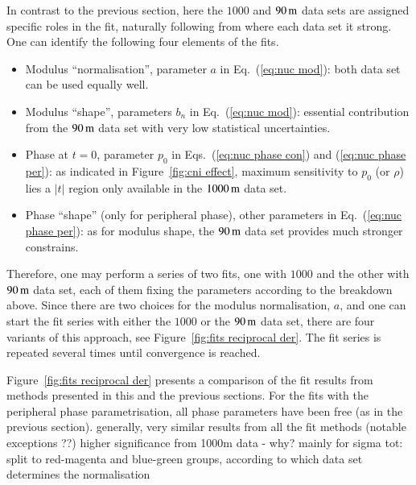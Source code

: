 In contrast to the previous section, here the $1000$ and $90\,{\rm m}$ data sets are assigned specific roles in the fit, naturally following from where each data set it strong. One can identify the following four elements of the fits.
\begin{itemize}
\item Modulus ``normalisation'', parameter $a$ in Eq.~(\ref{eq:nuc mod}): both data set can be used equally well.
\item Modulus ``shape'', parameters $b_n$ in Eq.~(\ref{eq:nuc mod}): essential contribution from the $90\,{\rm m}$ data set with very low statistical uncertainties.
\item Phase at $t = 0$, parameter $p_0$ in Eqs.~(\ref{eq:nuc phase con}) and (\ref{eq:nuc phase per}): as indicated in Figure~\ref{fig:cni effect}, maximum sensitivity to $p_0$ (or $\rho$) lies a $|t|$ region only available in the $1000\,{\rm m}$ data set.
\item Phase ``shape'' (only for peripheral phase), other parameters in Eq.~(\ref{eq:nuc phase per}): as for modulus shape, the $90\,{\rm m}$ data set provides much stronger constrains.
\end{itemize}
Therefore, one may perform a series of two fits, one with $1000$ and the other with $90\,{\rm m}$ data set, each of them fixing the parameters according to the breakdown above. Since there are two choices for the modulus normalisation, $a$, and one can start the fit series with either the $1000$ or the $90\,{\rm m}$ data set, there are four variants of this approach, see Figure~\ref{fig:fits reciprocal der}. The fit series is repeated several times until convergence is reached.

Figure~\ref{fig:fits reciprocal der} presents a comparison of the fit results from methods presented in this and the previous sections. For the fits with the peripheral phase parametrisation, all phase parameters have been free (as in the previous section). 
\> generally, very similar results from all the fit methods (notable exceptions ??)
\> higher significance from 1000m data - why?
\> mainly for sigma tot: split to red-magenta and blue-green groups, according to which data set determines the normalisation

